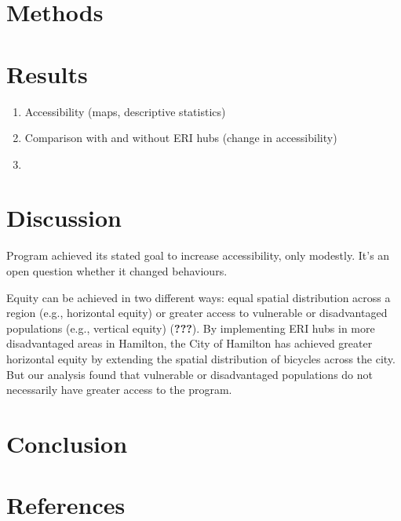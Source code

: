 \documentclass[]{elsarticle} %
\begin{document}
\hypertarget{methods}{%
\section{Methods}\label{methods}}

\hypertarget{results}{%
\section{Results}\label{results}}

\begin{enumerate}
\def\labelenumi{\arabic{enumi}.}
\item
  Accessibility (maps, descriptive statistics)
\item
  Comparison with and without ERI hubs (change in accessibility)
\item
\end{enumerate}

\hypertarget{discussion}{%
\section{Discussion}\label{discussion}}

Program achieved its stated goal to increase accessibility, only
modestly. It's an open question whether it changed behaviours.

Equity can be achieved in two different ways: equal spatial distribution
across a region (e.g., horizontal equity) or greater access to
vulnerable or disadvantaged populations (e.g., vertical equity)
({\textbf{???}}). By implementing ERI hubs in more disadvantaged areas
in Hamilton, the City of Hamilton has achieved greater horizontal equity
by extending the spatial distribution of bicycles across the city. But
our analysis found that vulnerable or disadvantaged populations do not
necessarily have greater access to the program.

\hypertarget{conclusion}{%
\section{Conclusion}\label{conclusion}}

\hypertarget{references}{%
\section*{References}\label{references}}
\end{document}
